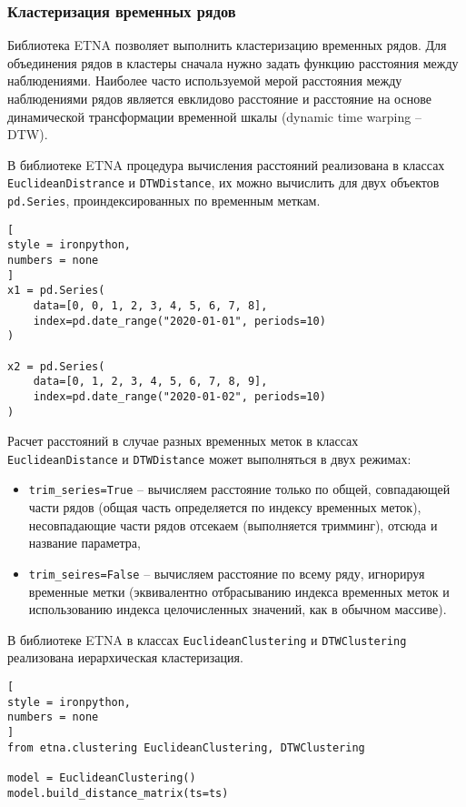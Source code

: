 \documentclass[%
	11pt,
	a4paper,
	utf8,
		]{article}
\begin{document}
\subsubsection{Кластеризация временных рядов}

Библиотека ETNA позволяет выполнить кластеризацию временных рядов. Для объединения рядов в кластеры сначала нужно задать функцию расстояния между наблюдениями. Наиболее часто используемой мерой расстояния между наблюдениями рядов является евклидово расстояние и расстояние на основе динамической трансформации временной шкалы (dynamic time warping -- DTW).

В библиотеке ETNA процедура вычисления расстояний реализована в классах \verb|EuclideanDistrance| и \verb|DTWDistance|, их можно вычислить для двух объектов \verb|pd.Series|, проиндексированных по временным меткам.
\begin{lstlisting}[
style = ironpython,
numbers = none
]
x1 = pd.Series(
    data=[0, 0, 1, 2, 3, 4, 5, 6, 7, 8],
    index=pd.date_range("2020-01-01", periods=10)
)

x2 = pd.Series(
    data=[0, 1, 2, 3, 4, 5, 6, 7, 8, 9],
    index=pd.date_range("2020-01-02", periods=10)
)
\end{lstlisting}

Расчет расстояний в случае разных временных меток в классах \verb|EuclideanDistance| и \verb|DTWDistance| может выполняться в двух режимах:
\begin{itemize}
	\item \verb|trim_series=True| -- вычисляем расстояние только по общей, совпадающей части рядов (общая часть определяется по индексу временных меток), несовпадающие части рядов отсекаем (выполняется тримминг), отсюда и название параметра,
	
	\item \verb|trim_seires=False| -- вычисляем расстояние по всему ряду, игнорируя временные метки (эквивалентно отбрасыванию индекса временных меток и использованию индекса целочисленных значений, как в обычном массиве).
\end{itemize}

В библиотеке ETNA в классах \verb|EuclideanClustering| и \verb|DTWClustering| реализована иерархическая кластеризация.
\begin{lstlisting}[
style = ironpython,
numbers = none
]
from etna.clustering EuclideanClustering, DTWClustering

model = EuclideanClustering()
model.build_distance_matrix(ts=ts)
\end{lstlisting}
\end{document}
